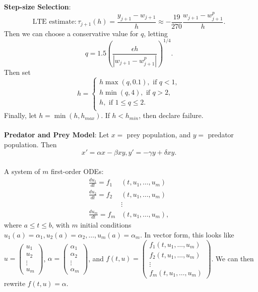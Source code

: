 \documentclass{article}
\begin{document}
\textbf{Step-size Selection}: $$\text{LTE estimate}: \tau_{j + 1}(h) = \frac{y_{j + 1} - w_{j + 1}}{h} \approx -\frac{19}{270} \frac{w_{j + 1} - w_{j + 1}^p}{h}.$$ Then we can choose a conservative value for $q$, letting $$q = 1.5\left( \frac{\epsilon h}{|w_{j + 1} - w_{j + 1}^p|}\right)^{1/4}.$$ Then set $$h = \begin{cases}
    h\max(q, 0.1), \text{ if } q < 1, \\
    h\min(q, 4), \text{ if } q > 2, \\
    h, \text{ if } 1 \leq q \leq 2. \\
\end{cases}$$ Finally, let $h = \min(h, h_{max})$. If $h < h_{min}$, then declare failure. \\ \\
\textbf{Predator and Prey Model}: Let $x =$ prey population, and $y =$ predator population. Then $$x' = \alpha x - \beta xy, y' = -\gamma y + \delta xy.$$ \\
A system of $m$ first-order ODEs: \begin{align*}
    \frac{du_1}{dt} = f_1&(t, u_1, \dots, u_m) \\
    \frac{du_2}{dt} = f_2&(t, u_1, \dots, u_m) \\
    &\vdots \\
    \frac{du_m}{dt} = f_m&(t, u_1, \dots, u_m),
\end{align*} where $a \leq t \leq b$, with $m$ initial conditions $u_1(a) = \alpha_1, u_2(a) = \alpha_2, \dots, u_m(a) = \alpha_m$. In vector form, this looks like $u = \begin{pmatrix}
    u_1 \\ u_2 \\ \vdots \\ u_m
\end{pmatrix}$, $\alpha = \begin{pmatrix}
    \alpha_1 \\ \alpha_2 \\ \vdots \\ \alpha_m
\end{pmatrix}$, and $f(t, u) = \begin{pmatrix}
    f_1(t, u_1, \dots, u_m) \\ f_2(t, u_1, \dots, u_m) \\ \vdots \\ f_m(t, u_1, \dots, u_m)
\end{pmatrix}$. We can then rewrite $f(t, u) = \alpha$. \\ \\ \\
\end{document}
